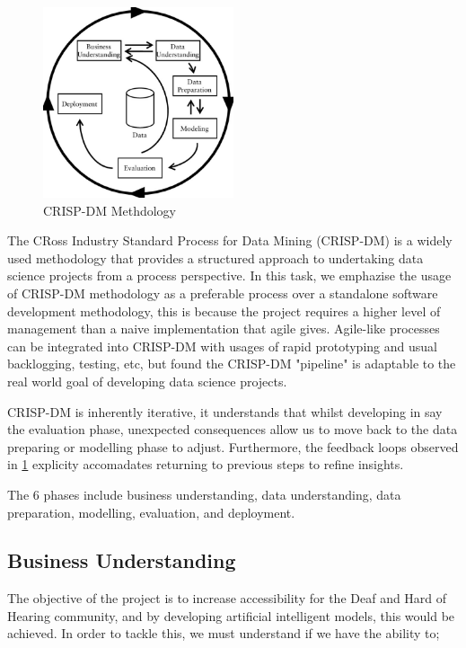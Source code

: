 \documentclass[preprint,12pt,review,authoryear]{elsarticle}
\begin{document}
\begin{figure}[h]
    \centering
    \includegraphics[width=0.5\textwidth]{images/CRISP-DM-process-model_W640.jpg}
    \caption{CRISP-DM Methdology\cite{lofstromUtilizingDiversityPerformance2009}}
    \label{fig:CRISP-DM Methdology}
\end{figure}

The CRoss Industry Standard Process for Data Mining (CRISP-DM) is a widely used methodology that provides a structured approach to undertaking data science projects from a process perspective. In this task, we emphazise the usage of CRISP-DM methodology as a preferable process over a standalone software development methodology, this is because the project requires a higher level of management than a naive implementation that agile gives. Agile-like processes can be integrated into CRISP-DM with usages of rapid prototyping and usual backlogging, testing, etc, but found the CRISP-DM "pipeline" is adaptable to the real world goal of developing data science projects.

CRISP-DM is inherently iterative, it understands that whilst developing in say the evaluation phase, unexpected consequences allow us to move back to the data preparing or modelling phase to adjust. Furthermore, the feedback loops observed in \ref{fig:CRISP-DM Methdology} explicity accomadates returning to previous steps to refine insights. 

The 6 phases include business understanding, data understanding, data preparation, modelling, evaluation, and deployment.

\subsection{Business Understanding}
The objective of the project is to increase accessibility for the Deaf and Hard of Hearing community, and by developing artificial intelligent models, this would be achieved. In order to tackle this, we must understand if we have the ability to;
\end{document}
